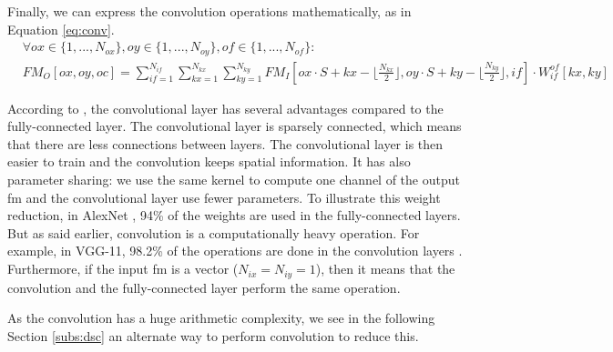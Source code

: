 Finally, we can express the convolution operations mathematically, as in Equation \eqref{eq:conv}.
%
{ \scriptsize
\begin{equation}
    \begin{split}
        & \forall ox \in \{ 1, ..., N_{ox} \}, oy \in \{ 1, ..., N_{oy} \}, of \in \{ 1, ..., N_{of} \} : \\
        & FM_O[ox, oy, oc] = \sum^{N_{if}}_{if=1}
        \sum^{N_{kx}}_{kx=1}
        \sum^{N_{ky}}_{ky=1}
        FM_I[ox \cdot S + kx - \lfloor \frac{N_{kx}}{2} \rfloor,  oy \cdot S + ky - \lfloor \frac{N_{ky}}{2} \rfloor, if] \cdot
        W^{of}_{if}[kx, ky]
    \end{split}
    \label{eq:conv}
\end{equation}
}

According to \textcite{goodfellow_deep_2016}, the convolutional layer has several advantages compared to the fully-connected layer. The convolutional layer is sparsely connected, which means that there are less connections between layers. The convolutional layer is then easier to train and the convolution keeps spatial information. It has also parameter sharing: we use the same kernel to compute one channel of the output \acrshort{fm} and the convolutional layer use fewer parameters. To illustrate this weight reduction, in AlexNet \cite{krizhevsky_imagenet_2012}, 94\% of the weights are used in the fully-connected layers. But as said earlier, convolution is a computationally heavy operation. For example, in VGG-11, 98.2\% of the operations are done in the convolution layers \cite{guo_survey_2018}. Furthermore, if the input \acrshort{fm} is a vector ($N_{ix} = N_{iy} = 1$), then it means that the convolution and the fully-connected layer perform the same operation.

As the convolution has a huge arithmetic complexity, we see in the following Section \ref{subs:dsc} an alternate way to perform convolution to reduce this.
